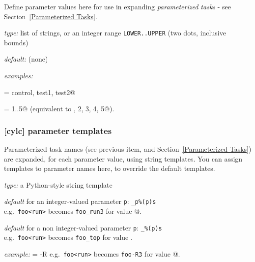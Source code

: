 Define parameter values here for use in expanding {\em parameterized tasks} -
see Section~\ref{Parameterized Tasks}.
\begin{myitemize}
    \item {\em type:} list of strings, or an integer range
        \lstinline=LOWER..UPPER= (two dots, inclusive bounds)
    \item {\em default:} (none)
    \item {\em examples:}
        \begin{myitemize}
            \item \lstinline@run = control, test1, test2@
            \item \lstinline@mem = 1..5@  (equivalent to , 2, 3, 4, 5@).
        \end{myitemize}
\end{myitemize}

\subsubsection[parameter templates]{[cylc] \textrightarrow parameter templates}
\label{RefParameterTemplates}

Parameterized task names (see previous item, and Section~\ref{Parameterized
Tasks}) are expanded, for each parameter value, using string templates.  You
can assign templates to parameter names here, to override the default templates.

\begin{myitemize}
    \item {\em type:} a Python-style string template
    \item {\em default} for an integer-valued parameter \lstinline=p=:
        \lstinline=_p%(p)s= \\
        e.g.\ \lstinline=foo<run>= becomes \lstinline=foo_run3= for
            \lstinline@run@ value @.
    \item {\em default} for a non integer-valued parameter \lstinline=p=:
        \lstinline=_%(p)s= \\
        e.g.\ \lstinline=foo<run>= becomes \lstinline=foo_top= for
            \lstinline@run@ value \lstinline@top@.
    \item {\em example:} \lstinline@run = -R%(run)s@ \\
            e.g.\ \lstinline=foo<run>= becomes \lstinline=foo-R3= for
            \lstinline@run@ value @.
\end{myitemize}

